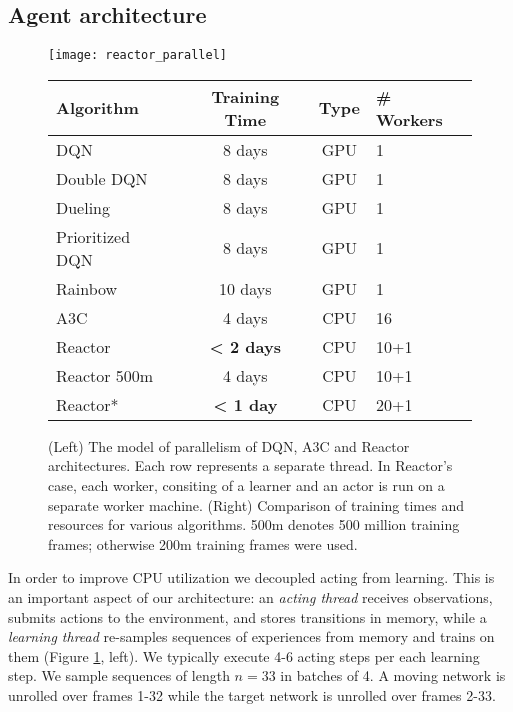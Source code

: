 \documentclass{article}
\begin{document}
\subsection{Agent architecture}\label{sec:agent_arch}
\begin{figure}[t]
\centering
\vspace{0pt}
\begin{minipage}{.35\textwidth}
\hspace{-20px}  \texttt{[image: reactor\_parallel]}\end{minipage}
\begin{minipage}{.01\textwidth}
\hspace{2px}
\end{minipage}
\vspace{0pt}
\begin{minipage}{.55\textwidth}
\begin{tabular}{| l | c | c | l |}
\hline
Algorithm & Training Time & Type & \# Workers \\
\hline
\hline
\cellcolor{dqn_color} DQN & 8 days & GPU & 1  \\
\cellcolor{dqn_color}  Double DQN & 8 days & GPU & 1  \\
\cellcolor{dqn_color} Dueling & 8 days & GPU & 1  \\
\cellcolor{dqn_color} Prioritized DQN & 8 days & GPU & 1  \\
\cellcolor{dqn_color} Rainbow & 10 days & GPU & 1  \\
\cellcolor{ac_color} A3C & 4 days & CPU & 16 \\
\cellcolor{reactor_color} Reactor & {\bf < 2 days} & CPU & 10+1 \\
\cellcolor{reactor_color} Reactor 500m & 4 days & CPU & 10+1 \\
\cellcolor{reactor_color} Reactor* & {\bf < 1 day} & CPU & 20+1 \\
\hline
\end{tabular}
\end{minipage}\caption{\small (Left) The model of parallelism of DQN, A3C and Reactor 
    architectures. Each row represents a separate thread. In Reactor's case,
    each worker, consiting of a learner and an actor is run on a separate 
    worker machine. (Right) Comparison of training times and resources for 
    various algorithms. 500m denotes 500 million training frames; otherwise 
    200m training frames were used.}
  \label{parallelism}
\end{figure}

In order to improve CPU utilization we decoupled acting from learning. 
This is an important aspect of our architecture: an {\em acting thread} 
receives observations, submits actions to the environment, and stores 
transitions in memory, while a {\em learning thread} re-samples 
sequences of experiences from memory and trains on them (Figure 
\ref{parallelism}, left). We typically execute 4-6 acting steps per each 
learning step. We sample sequences of length $n=33$ in batches of 4. A moving 
network is unrolled over frames 1-32 while the target network is unrolled over 
frames 2-33.
\end{document}

